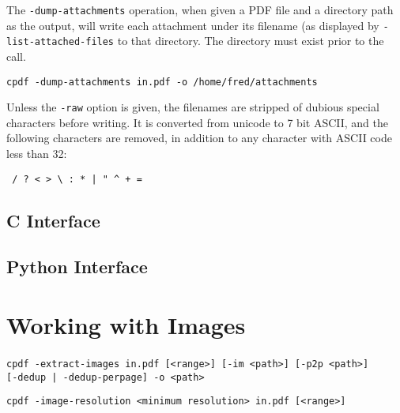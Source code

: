 \documentclass{book}
\begin{document}
The \texttt{-dump-attachments} operation, when given a PDF file and a directory path as the output, will write each attachment under its filename (as displayed by \texttt{-list-attached-files} to that directory. The directory must exist prior to the call.

  \begin{framed}
    \small\verb!cpdf -dump-attachments in.pdf -o /home/fred/attachments!
  \end{framed}

\noindent  Unless the \texttt{-raw} option is given, the filenames are stripped of dubious special characters before writing. It is converted from unicode to 7 bit ASCII, and the following characters are removed, in addition to any character with ASCII code less than 32:
  \begin{framed}
  \centering
  \verb! / ? < > \ : * | " ^ + =!
  \end{framed}

\begin{cpdflib}
\clearpage
\section*{C Interface}
\begin{small}\tt

\end{small}
\end{cpdflib}

\begin{pycpdflib}
\clearpage
\section*{Python Interface}
\begin{small}\tt

\end{small}
\end{pycpdflib}


\chapter{Working with Images}\label{chap:13}
\begin{framed}
\noindent\small\verb!cpdf -extract-images in.pdf [<range>] [-im <path>] [-p2p <path>]!
\noindent\small\verb!     [-dedup | -dedup-perpage] -o <path>!

\vspace{1.5mm}
\noindent\small\verb!cpdf -image-resolution <minimum resolution> in.pdf [<range>]!
\end{framed}
\end{document}
